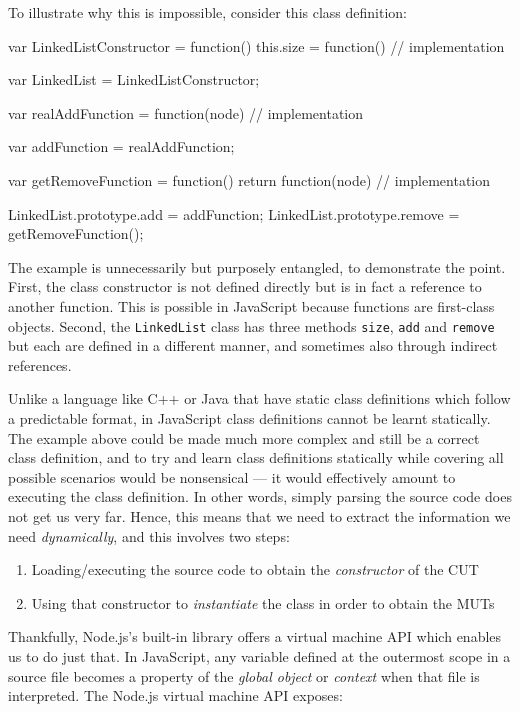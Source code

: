 To illustrate why this is impossible, consider this class definition:

\begin{code}[caption=Runtime dependent class definition,label=runtimeclassdef]

var LinkedListConstructor = function() {
    this.size = function() {
        // implementation
    }
}

var LinkedList = LinkedListConstructor;

var realAddFunction = function(node) {
    // implementation
}

var addFunction = realAddFunction;

var getRemoveFunction = function() {
    return function(node) {
        // implementation
    }
}

LinkedList.prototype.add = addFunction;
LinkedList.prototype.remove = getRemoveFunction();
\end{code}

The example is unnecessarily but purposely entangled, to demonstrate the point. First, the class constructor is not defined directly but is in fact a reference to another function. This is possible in JavaScript because functions are first-class objects. Second, the \texttt{LinkedList} class has three methods \texttt{size}, \texttt{add} and \texttt{remove} but each are defined in a different manner, and sometimes also through indirect references.

Unlike a language like C++ or Java that have static class definitions which follow a predictable format, in JavaScript class definitions cannot be learnt statically. The example above could be made much more complex and still be a correct class definition, and to try and learn class definitions statically while covering all possible scenarios would be nonsensical --- it would effectively amount to executing the class definition. In other words, simply parsing the source code does not get us very far. Hence, this means that we need to extract the information we need \emph{dynamically}, and this involves two steps:

\begin{enumerate}
   \item Loading/executing the source code to obtain the \emph{constructor} of the CUT
   \item Using that constructor to \emph{instantiate} the class in order to obtain the MUTs
\end{enumerate}

Thankfully, Node.js's built-in library offers a virtual machine API which enables us to do just that. In JavaScript, any variable defined at the outermost scope in a source file becomes a property of the \emph{global object} or \emph{context} when that file is interpreted. The Node.js virtual machine API exposes:\\

